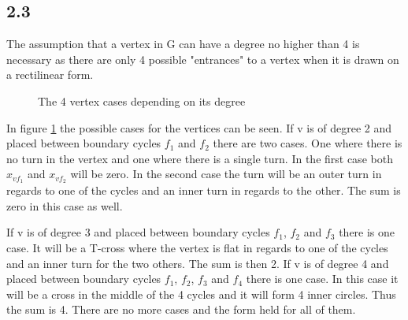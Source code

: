 \subsection*{2.3}
The assumption that a vertex in G can have a degree no higher than 4 is
necessary as there are only 4 possible "entrances" to a vertex when it is drawn
on a rectilinear form. 
\begin{figure}[!ht]
    \centering
    
    \caption{The 4 vertex cases depending on its degree} 
    \label{fig:degree}
\end{figure}

In figure \ref{fig:degree} the possible cases for the vertices can be seen.
If v is of degree 2 and placed between boundary cycles $f_1$ and $
f_2$ there are two cases. One where there is no turn in the vertex and
one where there is a single turn. In the first case both $x_{vf_1}$ and
$x_{vf_2}$ will be zero. In the second case the turn will be an outer turn
in regards to one of the cycles and an inner turn in regards to the other.
The sum is zero in this case as well.

If v is of degree 3 and placed between boundary cycles $f_1$, $f_2$ and $f_3$
there is one case. It will be a T-cross where the vertex is flat in regards to
one of the cycles and an inner turn for the two others. The sum is then 2.
If v is of degree 4 and placed between boundary cycles $f_1$, $f_2$,
$f_3$ and $f_4$ there is one case. In this case it will be a cross in the
middle of the 4 cycles and it will form 4 inner circles. Thus the sum is 4.
There are no more cases and the form held for all of them.


